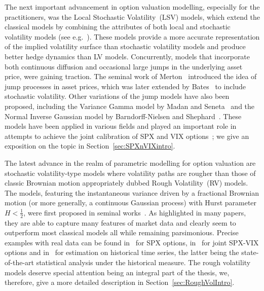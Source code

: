 The next important advancement in option valuation modelling, especially for the practitioners, was the Local Stochastic Volatility~(LSV) models, which extend the classical models by combining the attributes of both local and stochastic volatility models (see e.g.~\cite{Lipton2002TheProblem, Lipton2002UniversalBarriers}). These models provide a more accurate representation of the implied volatility surface than stochastic volatility models and produce better hedge dynamics than LV models. %
Concurrently, models that incorporate both continuous diffusion and occasional large jumps in the underlying asset price, were gaining traction. The seminal work of Merton~\cite{Merton1974ONRATES} introduced the idea of jump processes in asset prices, which was later extended by Bates~\cite{Bates1996JumpsOptions} to include stochastic volatility. %
Other variations of the jump models have also been proposed, including the Variance Gamma model by Madan and Seneta~\cite{Madan1990TheReturns} and the Normal Inverse Gaussian model by Barndorff-Nielsen and Shephard~\cite{Barndorff-Nielsen2001Non-GaussianEconomics}. These models have been applied in various fields and played an important role in attempts to achieve the joint calibration of SPX and VIX options~\cite{Cont2011ADERIVATIVES, Baldeaux2014ConsistentModel, Kokholm2015JointModels}; we give an exposition on the topic in Section~\ref{sec:SPXnVIXintro}. %

The latest advance in the realm of parametric modelling for option valuation are stochastic volatility-type models where volatility paths are rougher than those of classic Brownian motion appropriately dubbed Rough Volatility~(RV) models. The models, featuring the instantaneous variance driven by a fractional Brownian motion (or more generally, a continuous Gaussian process) with Hurst parameter $H < \frac{1}{2}$, were first proposed in seminal works~\cite{Bayer2015PricingVolatility, Gatheral2018VolatilityRough, Guennoun2018AsymptoticModel}. As highlighted in many papers, they are able to capture many features of market data and clearly seem to outperform most classical models all while remaining parsimonious. Precise examples with real data can be found in~\cite{Bayer2015PricingVolatility} for SPX options, in~\cite{Bondi2022TheModel, Gatheral2020TheProblem, Jaber2022JointHints, Horvath2020VolatilityModels} for joint SPX-VIX options and in~\cite{Bennedsen2022DecouplingVolatility, Gatheral2018VolatilityRough} for estimation on historical time series, the latter being the state-of-the-art statistical analysis under the historical measure. The rough volatility models deserve special attention being an integral part of the thesis, we, therefore, give a more detailed description in Section~\ref{sec:RoughVolIntro}.

